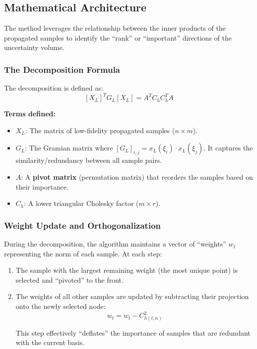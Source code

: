 \documentclass[
  letterpaper,
  DIV=11,
  numbers=noendperiod,
  oneside]{scrartcl}
\begin{document}
\subsection{Mathematical
Architecture}\label{mathematical-architecture-1}

The method leverages the relationship between the inner products of the
propagated samples to identify the ``rank'' or ``important'' directions
of the uncertainty volume.

\subsubsection{\texorpdfstring{\textbf{The Decomposition
Formula}}{The Decomposition Formula}}\label{the-decomposition-formula}

The decomposition is defined as: \[
[X_L]^T G_L [X_L] = A^T C_h C_h^T A
\]

\textbf{Terms defined:}

\begin{itemize}
\item
  \(X_L\): The matrix of low-fidelity propagated samples
  (\(n \times m\)).
\item
  \(G_L\): The Gramian matrix where
  \([G_L]_{i,j} = x_L(\xi_i) \cdot x_L(\xi_j)\). It captures the
  similarity/redundancy between all sample pairs.
\item
  \(A\): A \textbf{pivot matrix} (permutation matrix) that reorders the
  samples based on their importance.
\item
  \(C_h\): A lower triangular Cholesky factor (\(m \times r\)).
\end{itemize}

\subsubsection{\texorpdfstring{\textbf{Weight Update and
Orthogonalization}}{Weight Update and Orthogonalization}}\label{weight-update-and-orthogonalization}

During the decomposition, the algorithm maintains a vector of
``weights'' \(w_\ell\) representing the norm of each sample. At each
step:

\begin{enumerate}
\def\labelenumi{\arabic{enumi}.}
\item
  The sample with the largest remaining weight (the most unique point)
  is selected and ``pivoted'' to the front.
\item
  The weights of all other samples are updated by subtracting their
  projection onto the newly selected node: \[
  w_t = w_t - C_{h(t,n)}^2
  \]

  This step effectively ``deflates'' the importance of samples that are
  redundant with the current basis.
\end{enumerate}
\end{document}
